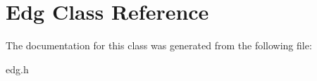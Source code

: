 \hypertarget{class_edg}{}\section{Edg Class Reference}
\label{class_edg}


The documentation for this class was generated from the following file\+:\begin{DoxyCompactItemize}
\item 
edg.\+h\end{DoxyCompactItemize}
